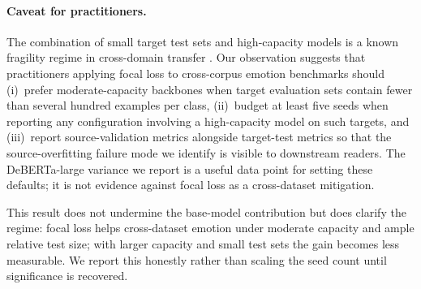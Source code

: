 \paragraph{Caveat for practitioners.}
The combination of small target test sets and high-capacity models is
a known fragility regime in cross-domain transfer
\citep{ben2010theory}. Our observation suggests that practitioners
applying focal loss to cross-corpus emotion benchmarks should
(i)~prefer moderate-capacity backbones when target evaluation sets
contain fewer than several hundred examples per class,
(ii)~budget at least five seeds when reporting any
configuration involving a high-capacity model on such targets, and
(iii)~report source-validation metrics alongside target-test metrics
so that the source-overfitting failure mode we identify is visible to
downstream readers. The DeBERTa-large variance we report is a useful
data point for setting these defaults; it is not evidence against
focal loss as a cross-dataset mitigation.

This result does not undermine the base-model contribution but does
clarify the regime: focal loss helps cross-dataset emotion under
moderate capacity and ample relative test size; with larger capacity
and small test sets the gain becomes less measurable. We report this
honestly rather than scaling the seed count until significance is
recovered.
